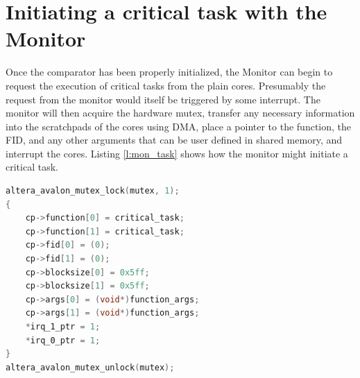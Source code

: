 \section{Initiating a critical task with the Monitor}
Once the comparator has been properly initialized, the Monitor can begin to request the execution of critical tasks from the plain cores. Presumably the request from the monitor would itself be triggered by some interrupt. The monitor will then acquire the hardware mutex, transfer any necessary information into the scratchpads of the cores using DMA, place a pointer to the function, the FID, and any other arguments that can be user defined in shared memory, and interrupt the cores. Listing \ref{l:mon_task} shows how the monitor might initiate a critical task.
\begin{lstlisting}[frame=single,language=C,label=l:mon_task,caption={[Mointor initiates a critical task on plain cores]The monitor requests cores 0 and 1 to begin executing a function called critical\_task with FID 0.}]
altera_avalon_mutex_lock(mutex, 1);
{
	cp->function[0] = critical_task;
	cp->function[1] = critical_task;	
	cp->fid[0] = (0);
	cp->fid[1] = (0);	
	cp->blocksize[0] = 0x5ff;
	cp->blocksize[1] = 0x5ff;
	cp->args[0] = (void*)function_args;
	cp->args[1] = (void*)function_args;
	*irq_1_ptr = 1;
	*irq_0_ptr = 1;
}
altera_avalon_mutex_unlock(mutex);
\end{lstlisting}
